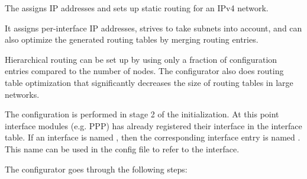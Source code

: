 The  assigns IP addresses and sets up
static routing for an IPv4 network.

It assigns per-interface IP addresses, strives to take subnets into account,
and can also optimize the generated routing tables by merging routing entries.

Hierarchical routing can be set up by using only a fraction of configuration
entries compared to the number of nodes. The configurator also does
routing table optimization that significantly decreases the size of routing
tables in large networks.

The configuration is performed in stage 2 of the initialization. At this
point interface modules (e.g. PPP) has already registered their interface
in the interface table. If an interface is named , then the
corresponding interface entry is named . This name can be used
in the config file to refer to the interface.

The configurator goes through the following steps:

